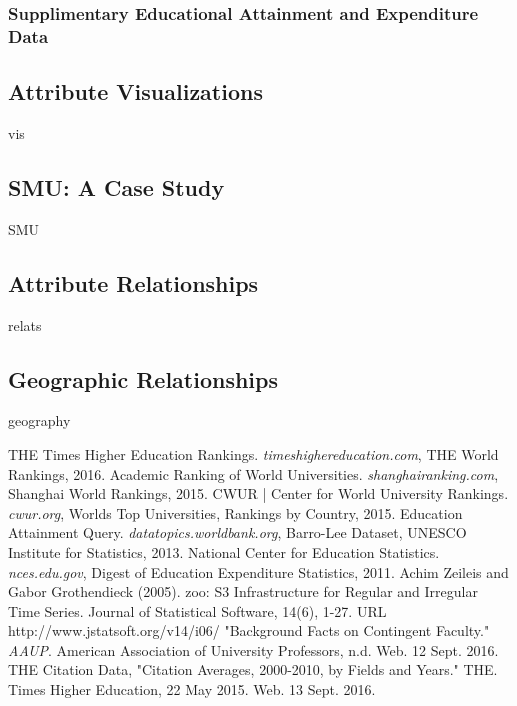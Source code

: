 \documentclass[12pt]{article}
\begin{document}
\subsubsection{Supplimentary Educational Attainment and Expenditure Data}


\subsection{Attribute Visualizations}
vis

\subsection{SMU: A Case Study}
SMU

\subsection{Attribute Relationships}
relats

\subsection{Geographic Relationships}
geography

\begin{thebibliography}{9} 

 THE Times Higher Education Rankings. \textit{timeshighereducation.com}, THE World Rankings, 2016.
 Academic Ranking of World Universities. \textit{shanghairanking.com}, Shanghai World Rankings, 2015.
 CWUR | Center for World University Rankings. \textit{cwur.org}, Worlds Top Universities, Rankings by Country, 2015.
 Education Attainment Query. \textit{datatopics.worldbank.org}, Barro-Lee Dataset, UNESCO Institute for Statistics, 2013.
 National Center for Education Statistics. \textit{nces.edu.gov}, Digest of Education Expenditure Statistics, 2011.
 Achim Zeileis and Gabor Grothendieck (2005). zoo: S3 Infrastructure for Regular and Irregular Time Series. Journal of Statistical Software,
  14(6), 1-27. URL http://www.jstatsoft.org/v14/i06/
 "Background Facts on Contingent Faculty." \textit{AAUP}. American Association of University Professors, n.d. Web. 12 Sept. 2016.
 THE Citation Data, "Citation Averages, 2000-2010, by Fields and Years." THE. Times Higher Education, 22 May 2015. Web. 13 Sept. 2016.
\end{thebibliography} 
\end{document}
